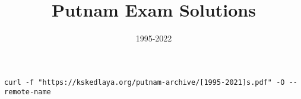 \documentclass{article}
\title{Putnam Exam Solutions}
\date{1995-2022}
\author{}
\begin{document}
\maketitle
\begin{center}
\begin{BVerbatim}
curl -f "https://kskedlaya.org/putnam-archive/[1995-2021]s.pdf" -O --remote-name
\end{BVerbatim}
\end{center}
\newpage
%
%
%
%
%
%
%
%
%
%
%




























\end{document}
